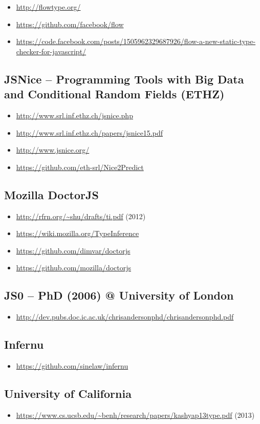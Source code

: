 \begin{itemize}
\item \url{http://flowtype.org/}
\item \url{https://github.com/facebook/flow}
\item \url{https://code.facebook.com/posts/1505962329687926/flow-a-new-static-type-checker-for-javascript/}
\end{itemize}

\subsection{JSNice -- Programming Tools with Big Data and Conditional Random Fields (ETHZ)}
\begin{itemize}
 \item \url{http://www.srl.inf.ethz.ch/jsnice.php}
 \item \url{http://www.srl.inf.ethz.ch/papers/jsnice15.pdf}
 \item \url{http://www.jsnice.org/}
 \item \url{https://github.com/eth-srl/Nice2Predict}
\end{itemize}

\subsection{Mozilla DoctorJS}
\begin{itemize}
\item \url{http://rfrn.org/~shu/drafts/ti.pdf} (2012)
\item \url{https://wiki.mozilla.org/TypeInference}
\item \url{https://github.com/dimvar/doctorjs}
\item \url{https://github.com/mozilla/doctorjs}
\end{itemize}

\subsection{JS0 -- PhD (2006) @ University of London}
\begin{itemize}
 \item \url{http://dev.pubs.doc.ic.ac.uk/chrisandersonphd/chrisandersonphd.pdf}
\end{itemize}

\subsection{Infernu}
\begin{itemize}
 \item \url{https://github.com/sinelaw/infernu}
\end{itemize}

\subsection{University of California}
\begin{itemize}
 \item \url{https://www.cs.ucsb.edu/~benh/research/papers/kashyap13type.pdf} (2013)
\end{itemize}
